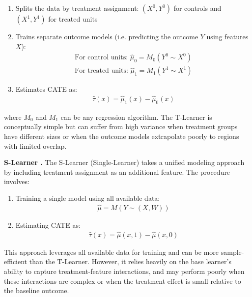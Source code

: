 \begin{enumerate}
    \item Splits the data by treatment assignment: ${(X^0, Y^0)}$ for controls and ${(X^1, Y^1)}$ for treated units
    \item Trains separate outcome models (i.e. predicting the outcome $Y$ using features $X$): 
        \begin{align*}
            \text{For control units: } \hat{\mu}_0 = M_0(Y^0 \sim X^0)\\
            \text{For treated units: } \hat{\mu}_1 = M_1(Y^1 \sim X^1)
        \end{align*}
    \item Estimates CATE as:
        \begin{align*}
            \hat{\tau}(x) = \hat{\mu}_1(x) - \hat{\mu}_0(x)
        \end{align*}
\end{enumerate}
where $M_0$ and $M_1$ can be any regression algorithm.
The T-Learner is conceptually simple but can suffer from high variance when treatment groups have different sizes or when the outcome models extrapolate poorly to regions with limited overlap.

\textbf{S-Learner \citep{ch04:kunzel2019metalearners}.} The S-Learner (Single-Learner) takes a unified modeling approach by including treatment assignment as an additional feature. The procedure involves:

\begin{enumerate}
    \item Training a single model using all available data:
        \begin{align*}
            \hat{\mu} = M(Y \sim (X, W))    
        \end{align*}
    \item Estimating CATE as: 
        \begin{align*}
            \hat{\tau}(x) = \hat{\mu}(x, 1) - \hat{\mu}(x, 0)
        \end{align*}
\end{enumerate}
This approach leverages all available data for training and can be more sample-efficient than the T-Learner.
However, it relies heavily on the base learner's ability to capture treatment-feature interactions, and may perform poorly when these interactions are complex or when the treatment effect is small relative to the baseline outcome.

